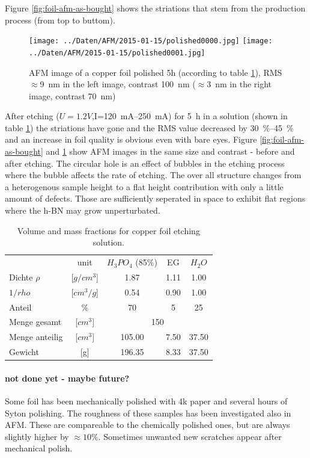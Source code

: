 Figure \ref{fig:foil-afm-as-bought} shows the striations that stem from the production process (from top to buttom).
\begin{figure}[h]
 \centering
 \texttt{[image: ../Daten/AFM/2015-01-15/polished0000.jpg]}
 \texttt{[image: ../Daten/AFM/2015-01-15/polished0001.jpg]}
 \caption{AFM image of a copper foil polished 5h (according to table \ref{tab:used-etching-solution}), RMS$\approx$\SI{9}{\nm} in the left image, contrast \SI{100}{\nm} ($\approx$\SI{3}{\nm} in the right image, contrast \SI{70}{\nm})}
 \label{fig:foil-afm-polished}
\end{figure}
After etching ($U=1.2V$,I=\SIrange{120}{250}{\mA}) for \SI{5}{\hour} in a solution (shown in table \ref{tab:used-etching-solution}) the striations have gone and the RMS value decreased by \SIrange{30}{45}{\percent} and an increase in foil quality is obvious even with bare eyes. Figure \ref{fig:foil-afm-as-bought} and \ref{fig:foil-afm-polished} show AFM images in the same size and contrast - before and after etching.
The circular hole is an effect of bubbles in the etching process where the bubble affects the rate of etching. The over all structure changes from a heterogenous sample height to a flat height contribution with only a little amount of defects. Those are sufficiently seperated in space to exhibit flat regions where the h-BN may grow unperturbated.

\begin{table}
\centering
\caption{Volume and mass fractions for copper foil etching solution.}
\begin{tabular}{lcccc}
		&unit	&$H_3PO_4$ (85\%)&	EG	&	$H_2O$	\\
Dichte $\rho$   &[$g/cm^3$]	&	1.87	&	1.11	&	1.00	\\
$1/rho$		&[$cm^3/g$]	&	0.54	&	0.90	&	1.00	\\
Anteil 		& \%		&	70	&	5	&	25	\\ \hline
Menge gesamt    &[$cm^3$]	&		\multicolumn{3}{c}{150} 	\\
Menge anteilig  &[$cm^3$]	&	105.00	&	7.50	&	37.50	\\
Gewicht         &[g]		&	196.35	&	8.33	&	37.50	\\
\end{tabular}
\label{tab:used-etching-solution}
\end{table}

\paragraph{not done yet - maybe future?}
Some foil has been mechanically polished with 4k paper and several hours of Syton polishing. The roughness of these samples has been investigated also in AFM. These are compareable to the chemically polished ones, but are always slightly higher by $\approx 10\%$. Sometimes unwanted new scratches appear after mechanical polish.

